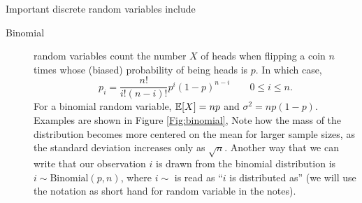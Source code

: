 Important discrete random variables include
\begin{description}
\item[Binomial]  random variables count the number $X$ of heads when
  flipping a coin $n$ times whose (biased) probability of being heads is $p$. In which case, 
\begin{equation}
  p_i = \frac{n!}{i!(n-i)!} p^i (1-p)^{n-i} \qquad 0\le i \le n.
\end{equation}
For a binomial random variable, $\mathbb{E}[X]=np$ and
$\sigma^2=np(1-p)$. Examples are shown in Figure \ref{Fig:binomial}, Note how the mass of the
   distribution becomes more centered on the mean for larger sample
   sizes, as the standard deviation increases only as $\sqrt{n}$. 
Another way that we can write that our observation $i$ is drawn from
the binomial distribution is $i \sim
\textrm{Binomial}(p,n)$, where $i \sim$ is read as ``$i$ is
distributed as'' (we will use the notation as short hand for random
variable in the notes).


\end{description}
